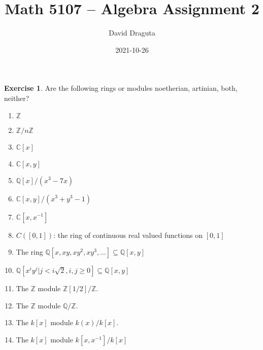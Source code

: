 \documentclass[12pt]{extarticle}
\title{ Math 5107 -- Algebra Assignment 2}
\author{David Draguta}
\date{2021-10-26}
\newcommand{\C}{\mathbb{C}}
\newcommand{\Q}{\mathbb{Q}}
\newcommand{\Z}{\mathbb{Z}}
\newcommand{\<}{\langle}
\renewcommand{\>}{\rangle}
\theoremstyle{definition}
\newtheorem{exercise}{Exercise}
\begin{document}
\maketitle

\begin{exercise}
  Are the following rings or modules noetherian, artinian, both, neither?
  \begin{enumerate}
  \item
    $\Z$
  \item
    $\Z/n\Z$
  \item
    $\C[x]$
  \item
    $\C[x,y]$
  \item
    $\Q[x]/(x^3-7x)$
  \item
    $\C[x,y]/(x^3+y^3-1)$
  \item
    $\C[x,x^{-1}]$
  \item
    $C([0,1])$: the ring of continuous real valued functions on $[0,1]$
  \item
    The ring $\Q[x,xy,xy^2,xy^3,\dots] \subseteq \Q[x,y]$
  \item
    $\Q[x^iy^j|j<i\sqrt{2}, i,j \geq 0] \subseteq \Q[x,y]$
  \item
    The $\Z$ module $\Z[1/2]/\Z$.
  \item
    The $\Z$ module $\Q/\Z$.
  \item
    The $k[x]$ module $k(x)/k[x]$.
  \item
    The $k[x]$ module $k[x,x^{-1}]/k[x]$ 
  \end{enumerate}
\end{exercise}
\end{document}

